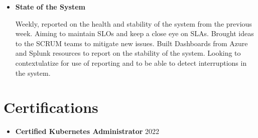 \documentclass[a4paper]{mctemplate} %
\begin{document}
\begin{main}
\begin{itemize}
    
    \item \textbf{State of the System}
    \hfill 

    Weekly, reported on the health and stability of the system from the previous week. Aiming to maintain SLOs and keep a close eye on SLAs. Brought ideas to the SCRUM teams to mitigate new issues. Built Dashboards from Azure and Splunk resources to report on the stability of the system. Looking to contextulatize for use of reporting and to be able to detect interruptions in the system.
    


    \vspace{0.5cm}
\end{itemize}

\section{Certifications}


\begin{itemize}
    \item \textbf{Certified Kubernetes Administrator}
    \newline
    {2022}

    \vspace{.3cm}
\end{itemize}

\end{main}
\end{document}
